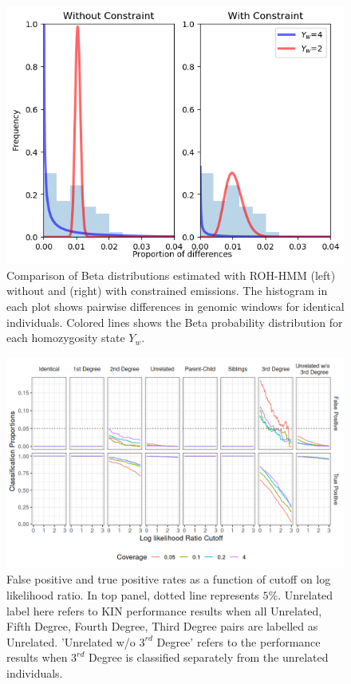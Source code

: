 \documentclass[12pt, letterpaper]{article}
\begin{document}
\begin{figure}[h!]
    \includegraphics[width=18cm]{supplementary_info/plots/contam0_inbred1_run57_coverage0.2_asc0_inputMode_hapProbs_fil0_ind0_forced_roh.png}
     \centering
    \caption{Comparison of Beta distributions estimated with ROH-HMM (left) without and (right) with constrained emissions. The histogram in each plot shows pairwise differences in genomic windows for identical individuals. Colored lines shows the Beta probability distribution for each homozygosity state $Y_w$.}
    \label{figS5:ROHforced}
\end{figure}

\begin{figure}[h!]
    \includegraphics[width=16cm]{plots/plotimg/contam0_inbred0_model_performance_allroc_asc0_plot.png}
    \centering
    \caption{False positive and true positive rates as a function of cutoff on log likelihood ratio. In top panel, dotted line represents $5\%$. Unrelated label here refers to KIN performance results when all Unrelated, Fifth Degree, Fourth Degree, Third Degree pairs are labelled as Unrelated. 'Unrelated w/o $3^{rd}$ Degree' refers to the performance results when $3^{rd}$ Degree is classified separately from the unrelated individuals.}
    \label{figS10:cutoff}
\end{figure}
\end{document}
